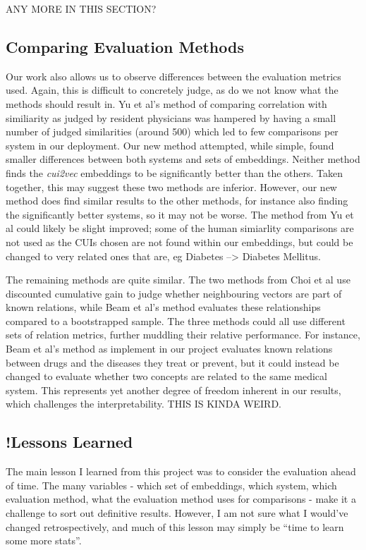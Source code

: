 \documentclass[10pt]{article}
\begin{document}
ANY MORE IN THIS SECTION?

\subsection{Comparing Evaluation Methods}
Our work also allows us to observe differences between the evaluation metrics used. Again, this is difficult to concretely judge, as do we not know what the methods should result in. Yu et al's method of comparing correlation with similiarity as judged by resident physicians was hampered by having a small number of judged similarities (around 500) which led to few comparisons per system in our deployment. Our new method attempted, while simple, found smaller differences between both systems and sets of embeddings. Neither method finds the \emph{cui2vec} embeddings to be significantly better than the others. Taken together, this may suggest these two methods are inferior. However, our new method does find similar results to the other methods, for instance also finding the significantly better systems, so it may not be worse. The method from Yu et al could likely be slight improved; some of the human simiarlity comparisons are not used as the CUIs chosen are not found within our embeddings, but could be changed to very related ones that are, eg Diabetes --> Diabetes Mellitus.  

The remaining methods are quite similar. The two methods from Choi et al use discounted cumulative gain to judge whether neighbouring vectors are part of known relations, while Beam et al's method evaluates these relationships compared to a bootstrapped sample. The three methods could all use different sets of relation metrics, further muddling their relative performance. For instance, Beam et al's method as implement in our project evaluates known relations between drugs and the diseases they treat or prevent, but it could instead be changed to evaluate whether two concepts are related to the same medical system. This represents yet another degree of freedom inherent in our results, which challenges the interpretability. THIS IS KINDA WEIRD. 

\subsection{!Lessons Learned}
The main lesson I learned from this project was to consider the evaluation ahead of time. The many variables - which set of embeddings, which system, which evaluation method, what the evaluation method uses for comparisons - make it a challenge to sort out definitive results. However, I am not sure what I would've changed retrospectively, and much of this lesson may simply be ``time to learn some more stats''. 
\end{document}
